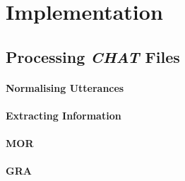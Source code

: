 \chapter{Implementation} %

\label{Chapter4} %


\section{Processing \emph{CHAT} Files}
\subsubsection{Normalising Utterances}

\subsubsection{Extracting Information}
\subsubsection{MOR}
\subsubsection{GRA}
